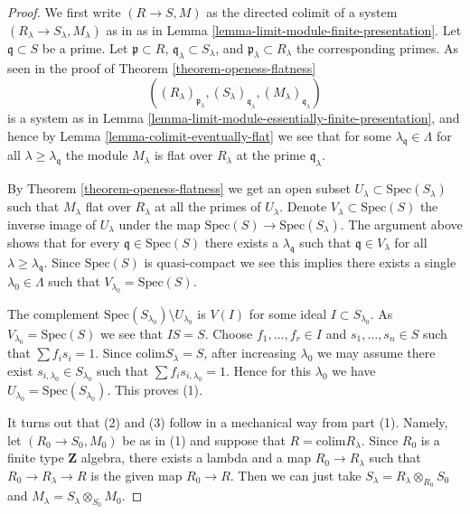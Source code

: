 \begin{proof}
We first write $(R \to S, M)$ as the directed colimit of a system
$(R_\lambda \to S_\lambda, M_\lambda)$ as in
as in Lemma \ref{lemma-limit-module-finite-presentation}.
Let $\mathfrak q \subset S$ be a prime.
Let $\mathfrak p \subset R$, $\mathfrak q_\lambda \subset S_\lambda$,
and $\mathfrak p_\lambda \subset R_\lambda$ the corresponding primes.
As seen in the proof of Theorem \ref{theorem-openess-flatness}
$$
((R_\lambda)_{\mathfrak p_\lambda},
(S_\lambda)_{\mathfrak q_\lambda},
(M_\lambda)_{\mathfrak q_{\lambda}})
$$
is a system as in
Lemma \ref{lemma-limit-module-essentially-finite-presentation}, and
hence by Lemma \ref{lemma-colimit-eventually-flat}
we see that for some $\lambda_{\mathfrak q} \in \Lambda$
for all $\lambda \geq \lambda_{\mathfrak q}$
the module $M_\lambda$ is flat over
$R_\lambda$ at the prime $\mathfrak q_{\lambda}$.

\medskip\noindent
By Theorem \ref{theorem-openess-flatness} we get an open subset
$U_\lambda \subset \text{Spec}(S_\lambda)$ such that $M_\lambda$
flat over $R_\lambda$ at all the primes of $U_\lambda$.
Denote $V_\lambda \subset \text{Spec}(S)$ the inverse image of
$U_\lambda$ under the map $\text{Spec}(S) \to \text{Spec}(S_\lambda)$.
The argument above shows that for every $\mathfrak q \in \text{Spec}(S)$
there exists a $\lambda_{\mathfrak q}$ such that
$\mathfrak q \in V_\lambda$ for all $\lambda \geq \lambda_{\mathfrak q}$.
Since $\text{Spec}(S)$ is quasi-compact we see this implies there
exists a single $\lambda_0 \in \Lambda$ such that
$V_{\lambda_0} = \text{Spec}(S)$.

\medskip\noindent
The complement $\text{Spec}(S_{\lambda_0}) \setminus U_{\lambda_0}$
is $V(I)$ for some ideal $I \subset S_{\lambda_0}$. As
$V_{\lambda_0} = \text{Spec}(S)$ we see that $IS = S$.
Choose $f_1, \ldots, f_r \in I$ and $s_1, \ldots, s_n \in S$ such
that $\sum f_i s_i = 1$. Since $\text{colim} S_\lambda = S$, after
increasing $\lambda_0$ we may assume there exist
$s_{i, \lambda_0} \in S_{\lambda_0}$ such that
$\sum f_i s_{i, \lambda_0} = 1$.
Hence for this $\lambda_0$ we have
$U_{\lambda_0} = \text{Spec}(S_{\lambda_0})$.
This proves (1).

\medskip\noindent
It turns out that (2) and (3) follow in a mechanical way from part (1).
Namely, let $(R_0 \to S_0, M_0)$ be as in (1) and suppose that
$R = \text{colim} R_\lambda$. Since $R_0$ is a finite type $\mathbf{Z}$
algebra, there exists a lambda and a map $R_0 \to R_\lambda$ such
that $R_0 \to R_\lambda \to R$ is the given map $R_0 \to R$.
Then we can just take $S_\lambda = R_\lambda \otimes_{R_0} S_0$
and $M_\lambda = S_\lambda \otimes_{S_0} M_0$.


\end{proof}
